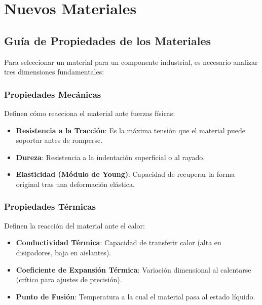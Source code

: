 \documentclass[../main]{subfiles}
\begin{document}
\chapter{Nuevos Materiales}


\section{Guía de Propiedades de los Materiales}
Para seleccionar un material para un componente industrial, es necesario analizar tres dimensiones fundamentales:

\subsection{Propiedades Mecánicas}
Definen cómo reacciona el material ante fuerzas físicas:
\begin{itemize}
  \item \textbf{Resistencia a la Tracción}: Es la máxima tensión que el material puede soportar antes de romperse.
  \item \textbf{Dureza}: Resistencia a la indentación superficial o al rayado.
  \item \textbf{Elasticidad (Módulo de Young)}: Capacidad de recuperar la forma original tras una deformación elástica.
\end{itemize}

\subsection{Propiedades Térmicas}
Definen la reacción del material ante el calor:
\begin{itemize}
  \item \textbf{Conductividad Térmica}: Capacidad de transferir calor (alta en disipadores, baja en aislantes).
  \item \textbf{Coeficiente de Expansión Térmica}: Variación dimensional al calentarse (crítico para ajustes de precisión).
  \item \textbf{Punto de Fusión}: Temperatura a la cual el material pasa al estado líquido.
\end{itemize}
\end{document}

